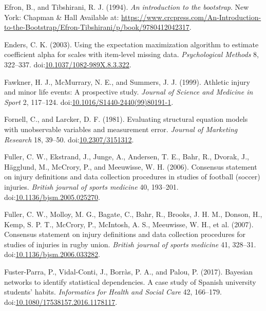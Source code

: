 \documentclass[
]{frontiersHLTH}
\newlength{\cslhangindent}
\newenvironment{cslreferences}%
  {\setlength{\parindent}{0pt}%
  \everypar{\setlength{\hangindent}{\cslhangindent}}\ignorespaces}%
  {\par}
\begin{document}
\begin{cslreferences}
\leavevmode\hypertarget{ref-Efron1993}{}%
Efron, B., and Tibshirani, R. J. (1994). \emph{An introduction to the
bootstrap}. New York: Chapman \& Hall Available at:
\url{https://www.crcpress.com/An-Introduction-to-the-Bootstrap/Efron-Tibshirani/p/book/9780412042317}.

\leavevmode\hypertarget{ref-Enders2003}{}%
Enders, C. K. (2003). Using the expectation maximization algorithm to
estimate coefficient alpha for scales with item-level missing data.
\emph{Psychological Methods} 8, 322--337.
doi:\href{https://doi.org/10.1037/1082-989X.8.3.322}{10.1037/1082-989X.8.3.322}.

\leavevmode\hypertarget{ref-Fawkner1999}{}%
Fawkner, H. J., McMurrary, N. E., and Summers, J. J. (1999). Athletic
injury and minor life events: A prospective study. \emph{Journal of
Science and Medicine in Sport} 2, 117--124.
doi:\href{https://doi.org/10.1016/S1440-2440(99)80191-1}{10.1016/S1440-2440(99)80191-1}.

\leavevmode\hypertarget{ref-Fornell1981}{}%
Fornell, C., and Larcker, D. F. (1981). Evaluating structural equation
models with unobservable variables and measurement error. \emph{Journal
of Marketing Research} 18, 39--50.
doi:\href{https://doi.org/10.2307/3151312}{10.2307/3151312}.

\leavevmode\hypertarget{ref-Fuller2006}{}%
Fuller, C. W., Ekstrand, J., Junge, A., Andersen, T. E., Bahr, R.,
Dvorak, J., Hägglund, M., McCrory, P., and Meeuwisse, W. H. (2006).
Consensus statement on injury definitions and data collection procedures
in studies of football (soccer) injuries. \emph{British journal of
sports medicine} 40, 193--201.
doi:\href{https://doi.org/10.1136/bjsm.2005.025270}{10.1136/bjsm.2005.025270}.

\leavevmode\hypertarget{ref-Fuller2007b}{}%
Fuller, C. W., Molloy, M. G., Bagate, C., Bahr, R., Brooks, J. H. M.,
Donson, H., Kemp, S. P. T., McCrory, P., McIntosh, A. S., Meeuwisse, W.
H., et al. (2007). Consensus statement on injury definitions and data
collection procedures for studies of injuries in rugby union.
\emph{British journal of sports medicine} 41, 328--31.
doi:\href{https://doi.org/10.1136/bjsm.2006.033282}{10.1136/bjsm.2006.033282}.

\leavevmode\hypertarget{ref-Fuster-Parra2017}{}%
Fuster-Parra, P., Vidal-Conti, J., Borràs, P. A., and Palou, P. (2017).
Bayesian networks to identify statistical dependencies. A case study of
Spanish university students' habits. \emph{Informatics for Health and
Social Care} 42, 166--179.
doi:\href{https://doi.org/10.1080/17538157.2016.1178117}{10.1080/17538157.2016.1178117}.


\end{cslreferences}
\end{document}
